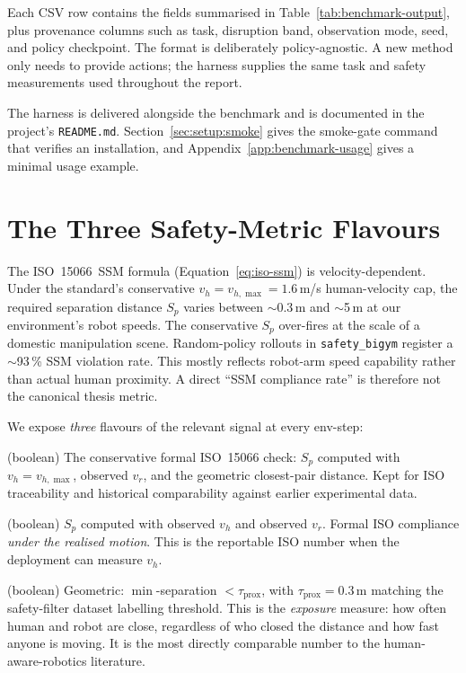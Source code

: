 \documentclass[11pt,a4paper]{report}
\newcommand{\ssm}{SSM}
\newcommand{\iso}{ISO~15066}
\newcommand{\sbigym}{\texttt{safety\_bigym}}
\begin{document}
Each CSV row contains the fields summarised in
Table~\ref{tab:benchmark-output}, plus provenance columns such as task,
disruption band, observation mode, seed, and policy checkpoint. The
format is deliberately policy-agnostic. A new method only needs to
provide actions; the harness supplies the same task and safety
measurements used throughout the report.

The harness is delivered alongside the benchmark and is documented in
the project's \texttt{README.md}. Section~\ref{sec:setup:smoke} gives
the smoke-gate command that verifies an installation, and
Appendix~\ref{app:benchmark-usage} gives a minimal usage example.



\section{The Three Safety-Metric Flavours}
\label{sec:bench:metrics:flavours}

The \iso{}~\ssm{} formula (Equation~\ref{eq:iso-ssm}) is
velocity-dependent. Under the standard's conservative
$v_h = v_{h,\max} = 1.6$\,m/s human-velocity cap, the required
separation distance $S_p$ varies between $\sim$0.3\,m and $\sim$5\,m
at our environment's robot speeds. The conservative $S_p$ over-fires
at the scale of a domestic manipulation scene. Random-policy rollouts
in \sbigym{} register a $\sim$93\,\% \ssm{} violation rate. This
mostly reflects robot-arm speed capability rather than actual human
proximity. A direct ``\ssm{} compliance rate'' is therefore not the
canonical thesis metric.

We expose \emph{three} flavours of the relevant signal at every
env-step:

\begin{description}[leftmargin=2em]
\item[\texttt{ssm\_violation}] (boolean) The conservative formal
  \iso{} check: $S_p$ computed with $v_h = v_{h,\max}$, observed
  $v_r$, and the geometric closest-pair distance. Kept for ISO
  traceability and historical comparability against earlier
  experimental data.
\item[\texttt{ssm\_violation\_actual}] (boolean) $S_p$ computed
  with observed $v_h$ and observed $v_r$. Formal ISO compliance
  \emph{under the realised motion}. This is the reportable ISO
  number when the deployment can measure $v_h$.
\item[\texttt{proximity\_violation}] (boolean) Geometric: $\min$-separation
  $< \tau_{\mathrm{prox}}$, with $\tau_{\mathrm{prox}} = 0.3$\,m
  matching the safety-filter dataset labelling threshold.
  This is the \emph{exposure} measure: how often human and robot are
  close, regardless of who closed the distance and how fast anyone
  is moving. It is the most directly comparable number to the
  human-aware-robotics literature.
\end{description}
\end{document}
